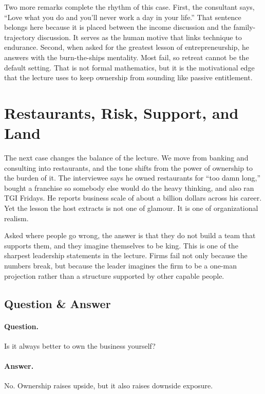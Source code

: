 Two more remarks complete the rhythm of this case. First, the consultant says, ``Love what you do and you'll never work a day in your life.'' That sentence belongs here because it is placed between the income discussion and the family-trajectory discussion. It serves as the human motive that links technique to endurance. Second, when asked for the greatest lesson of entrepreneurship, he answers with the burn-the-ships mentality. Most fail, so retreat cannot be the default setting. That is not formal mathematics, but it is the motivational edge that the lecture uses to keep ownership from sounding like passive entitlement.

\section{Restaurants, Risk, Support, and Land}

The next case changes the balance of the lecture. We move from banking and consulting into restaurants, and the tone shifts from the power of ownership to the burden of it. The interviewee says he owned restaurants for ``too damn long,'' bought a franchise so somebody else would do the heavy thinking, and also ran TGI Fridays. He reports business scale of about a billion dollars across his career. Yet the lesson the host extracts is not one of glamour. It is one of organizational realism.

Asked where people go wrong, the answer is that they do not build a team that supports them, and they imagine themselves to be king. This is one of the sharpest leadership statements in the lecture. Firms fail not only because the numbers break, but because the leader imagines the firm to be a one-man projection rather than a structure supported by other capable people.

\subsection{Question \& Answer}

\paragraph{Question.} Is it always better to own the business yourself?

\paragraph{Answer.} No. Ownership raises upside, but it also raises downside exposure.

